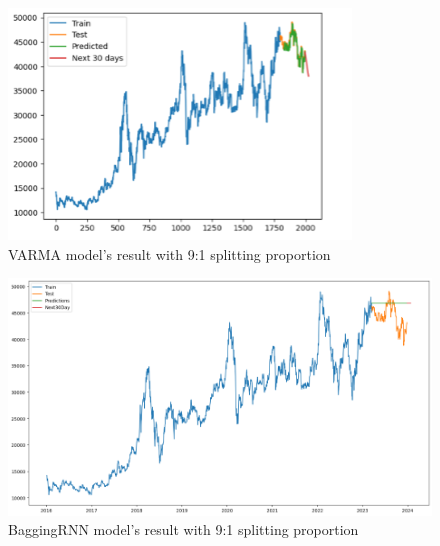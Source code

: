 \documentclass{ieeeojies}
\begin{document}
\begin{figure}[H]
  \centering
  \begin{minipage}{0.8\linewidth}
    \centering
    \includegraphics[width=\linewidth]{bibliography/GRU_BIDV91.png}
    \caption{VARMA model's result with 9:1 splitting proportion}
    \label{fig24}
  \end{minipage}
\end{figure}
\begin{figure}[H]
  \centering
  \begin{minipage}{0.8\linewidth}
    \centering
    \includegraphics[width=\linewidth]{bibliography/ARIMA_BIDV91.png}
    \caption{BaggingRNN model's result with 9:1 splitting proportion}
    \label{fig25}
  \end{minipage}
\end{figure}
\end{document}
